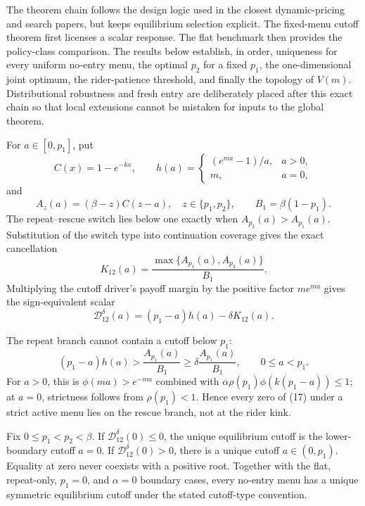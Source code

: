 \documentclass[mnsc,blindrev]{informs3}
\newcommand{\ph}{\phi}
\begin{document}
The theorem chain follows the design logic used in the closest dynamic-pricing
and search papers, but keeps equilibrium selection explicit.  The fixed-menu
cutoff theorem first licenses a scalar response.  The flat benchmark then
provides the policy-class comparison.  The results below establish,
in order, uniqueness for every uniform no-entry menu, the optimal $p_2$ for a
fixed $p_1$, the one-dimensional joint optimum, the rider-patience threshold,
and finally the topology of $V(m)$.  Distributional robustness and fresh
entry are deliberately placed after this exact chain so that local extensions
cannot be mistaken for inputs to the global theorem.

For $a\in[0,p_1]$, put
\[
 C(x)=1-e^{-kx},\qquad
 h(a)=\begin{cases}(e^{ma}-1)/a,&a>0,\\m,&a=0,\end{cases}   \tag{14}
\]
and
\[
 A_z(a)=(\beta-z)C(z-a),\quad z\in\{p_1,p_2\},
 \qquad B_1=\beta(1-p_1).                                  \tag{15}
\]
The repeat--rescue switch lies below one exactly when
$A_{p_2}(a)>A_{p_1}(a)$.
Substitution of the switch type into continuation coverage gives the exact
cancellation
\[
 K_{12}(a)
 =\frac{\max\{A_{p_1}(a),A_{p_2}(a)\}}{B_1}.               \tag{16}
\]
Multiplying the cutoff driver's payoff margin by the positive factor
$me^{ma}$ gives the sign-equivalent scalar
\[
 \mathcal D_{12}^{\delta}(a)
 =(p_1-a)h(a)-\delta K_{12}(a).                            \tag{17}
\]

The repeat branch cannot contain a cutoff below $p_1$:
\[
 (p_1-a)h(a)>\frac{A_{p_1}(a)}{B_1}
 \ge\delta\frac{A_{p_1}(a)}{B_1},\qquad 0\le a<p_1.       \tag{18}
\]
For $a>0$, this is $\ph(ma)>e^{-ma}$ combined with
$\alpha\rho(p_1)\ph(k(p_1-a))\le1$; at $a=0$, strictness follows from
$\rho(p_1)<1$.  Hence every zero of (17) under a strict active menu lies on the
rescue branch, not at the rider kink.

\begin{theorem}
\label{thm:unique}
Fix $0\le p_1<p_2<\beta$.  If $\mathcal D_{12}^{\delta}(0)\le0$, the unique equilibrium
cutoff is the lower-boundary cutoff $a=0$.  If
$\mathcal D_{12}^{\delta}(0)>0$, there is a unique cutoff $a\in(0,p_1)$.  Equality at
zero never coexists with a positive root.  Together with the flat,
repeat-only, $p_1=0$, and $\alpha=0$ boundary cases, every no-entry menu has a
unique symmetric equilibrium cutoff under the stated cutoff-type convention.
\end{theorem}
\end{document}
